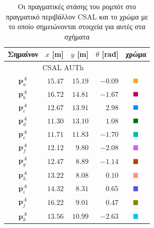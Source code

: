 \begin{table}\centering
  \begin{tabular} {c|rrrc}                                                 \toprule
    Σημαίνον       & $x$ [m]   & $y$  [m]  & $\theta$ [rad]  & χρώμα    \\ \toprule
    \multicolumn{4}{c}{CSAL AUTh}                                       \\ \midrule
    $\bm{p}_a^A$   & $15.47$   & $15.19$   & $-0.09$         & $\squarea$ \\
    $\bm{p}_b^A$   & $16.72$   & $14.81$   & $-1.67$         & $\squareb$ \\
    $\bm{p}_c^A$   & $12.67$   & $13.91$   & $2.98$          & $\squarec$ \\
    $\bm{p}_d^A$   & $11.30$   & $13.10$   & $1.08$          & $\squared$ \\
    $\bm{p}_e^A$   & $11.71$   & $11.83$   & $-1.70$         & $\squaree$ \\
    $\bm{p}_f^A$   & $12.12$   & $9.80$    & $-2.08$         & $\squaref$ \\
    $\bm{p}_g^A$   & $12.47$   & $8.89$    & $-1.14$         & $\squareg$ \\
    $\bm{p}_h^A$   & $13.22$   & $8.08$    & $0.10$          & $\squareh$ \\
    $\bm{p}_i^A$   & $14.32$   & $8.31$    & $0.65$          & $\squarei$ \\
    $\bm{p}_j^A$   & $16.22$   & $9.01$    & $0.47$          & $\squarej$ \\
    $\bm{p}_k^A$   & $13.56$   & $10.99$   & $-2.63$         & $\squarek$ \\ \bottomrule
  \end{tabular}
  \caption{\small Οι πραγματικές στάσης του ρομπότ στο πραγματικό περιβάλλον
           CSAL και το χρώμα με το οποίο σημειώνονται στοιχεία για αυτές στα
           σχήματα}
  \label{tbl:02_03_04:true_poses_experiment}
\end{table}



